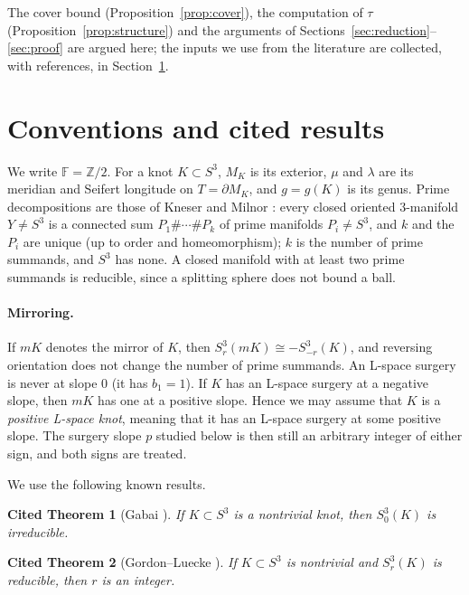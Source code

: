 \documentclass[11pt]{article}
\newtheorem{citedthm}{Cited Theorem}
\theoremstyle{definition}
\newcommand{\F}{\mathbb{F}}
\newcommand{\Z}{\mathbb{Z}}
\begin{document}

The cover bound (Proposition~\ref{prop:cover}), the computation of $\tau$ (Proposition~\ref{prop:structure}) and the arguments of Sections~\ref{sec:reduction}--\ref{sec:proof} are argued here; the inputs we use from the literature are collected, with references, in Section~\ref{sec:cited}.


\section{Conventions and cited results}\label{sec:cited}

We write $\F=\Z/2$. For a knot $K\subset S^3$, $M_K$ is its exterior, $\mu$ and $\lambda$ are its meridian and Seifert longitude on $T=\partial M_K$, and $g=g(K)$ is its genus. Prime decompositions are those of Kneser and Milnor \cite{Kneser,Milnor}: every closed oriented $3$-manifold $Y\ne S^3$ is a connected sum $P_1\#\cdots\# P_k$ of prime manifolds $P_i\ne S^3$, and $k$ and the $P_i$ are unique (up to order and homeomorphism); $k$ is the number of prime summands, and $S^3$ has none. A closed manifold with at least two prime summands is reducible, since a splitting sphere does not bound a ball.

\paragraph{Mirroring.} If $mK$ denotes the mirror of $K$, then $S^3_r(mK)\cong -S^3_{-r}(K)$, and reversing orientation does not change the number of prime summands. An L-space surgery is never at slope $0$ (it has $b_1=1$). If $K$ has an L-space surgery at a negative slope, then $mK$ has one at a positive slope. Hence we may assume that $K$ is a \emph{positive L-space knot}, meaning that it has an L-space surgery at some positive slope. The surgery slope $p$ studied below is then still an arbitrary integer of either sign, and both signs are treated.

\medskip
We use the following known results.

\begin{citedthm}[Gabai \cite{Gabai}]\label{thm:gabai}
If $K\subset S^3$ is a nontrivial knot, then $S^3_0(K)$ is irreducible.
\end{citedthm}

\begin{citedthm}[Gordon--Luecke \cite{GL87}]\label{thm:GL87}
If $K\subset S^3$ is nontrivial and $S^3_r(K)$ is reducible, then $r$ is an integer.
\end{citedthm}
\end{document}
